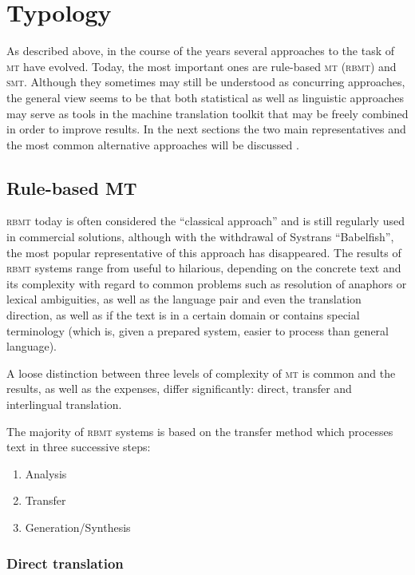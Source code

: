 \documentclass[output=paper]{LSP/langsci}
\begin{document}
\section{Typology}\label{sec:stein:3}
 
As described above, in the course of the years several approaches to the task of \textsc{mt} have evolved. Today, the most important ones are rule-based \textsc{mt} (\textsc{rbmt}) and \textsc{smt}. Although they sometimes may still be understood as concurring approaches, the general view seems to be that both statistical as well as linguistic approaches may serve as tools in the machine translation toolkit that may be freely combined in order to improve results. In the next sections the two main representatives and the most common alternative approaches will be discussed \citep{Jekat2010}.

\subsection{Rule-based MT}\label{sec:stein:3.1}

\textsc{rbmt} today is often considered the ``classical approach'' and is still regularly used in commercial solutions, although with the withdrawal of Systrans ``Babelfish'', the most popular representative of this approach has disappeared. The results of \textsc{rbmt} systems range from useful to hilarious, depending on the concrete text and its complexity with regard to common problems such as resolution of anaphors or lexical ambiguities, as well as the language pair and even the translation direction, as well as if the text is in a certain domain or contains special terminology (which is, given a prepared system, easier to process than general language). 
 
A loose distinction between three levels of complexity of \textsc{mt} is common and the results, as well as the expenses, differ significantly: direct, transfer and interlingual translation.
 
The majority of \textsc{rbmt} systems is based on the transfer method which processes text in three successive steps: 

\begin{enumerate}
\item 
Analysis
\item
Transfer
\item 
Generation/Synthesis
\end{enumerate}

\subsubsection{Direct translation}\label{sec:stein:3.1.1}
\end{document}
